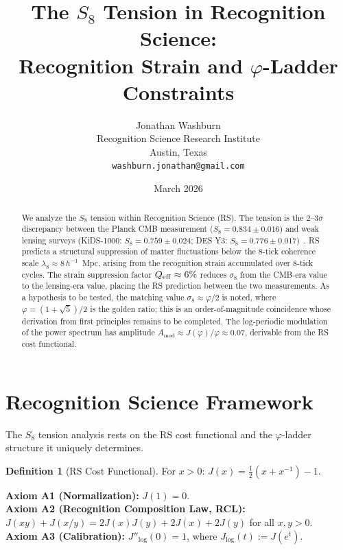 \documentclass[12pt,a4paper]{article}
\title{The $S_8$ Tension in Recognition Science:\\
Recognition Strain and $\varphi$-Ladder Constraints}
\author{Jonathan Washburn\\
Recognition Science Research Institute\\
Austin, Texas\\
\texttt{washburn.jonathan@gmail.com}}
\date{March 2026}
\theoremstyle{definition}
\newtheorem{definition}[theorem]{Definition}
\theoremstyle{remark}
\begin{document}
\maketitle

\begin{abstract}
We analyze the $S_8$ tension within Recognition Science (RS).  The
tension is the $2$--$3\sigma$ discrepancy between the Planck CMB
measurement ($S_8 = 0.834 \pm 0.016$) and weak lensing surveys
(KiDS-1000: $S_8 = 0.759 \pm 0.024$; DES Y3: $S_8 = 0.776 \pm
0.017$)~\cite{Asgari2021,DES2022}.  RS predicts a structural
suppression of matter fluctuations below the 8-tick coherence scale
$\lambda_8 \approx 8\,h^{-1}$~Mpc, arising from the recognition strain
accumulated over 8-tick cycles.  The strain suppression factor
$Q_{\rm eff} \approx 6\%$ reduces $\sigma_8$ from the CMB-era value to
the lensing-era value, placing the RS prediction between the two
measurements.  As a hypothesis to be tested, the matching value
$\sigma_8 \approx \varphi/2$ is noted, where $\varphi = (1+\sqrt{5})/2$
is the golden ratio; this is an order-of-magnitude coincidence whose
derivation from first principles remains to be completed.  The
log-periodic modulation of the power spectrum has amplitude
$A_{\mathrm{mod}} \approx J(\varphi)/\varphi \approx 0.07$, derivable
from the RS cost functional.
\end{abstract}

\section{Recognition Science Framework}
\label{sec:framework}

The $S_8$ tension analysis rests on the RS cost functional and the
$\varphi$-ladder structure it uniquely determines.

\begin{definition}[RS Cost Functional]
For $x > 0$: $J(x) = \tfrac{1}{2}(x + x^{-1}) - 1$.
\end{definition}

\noindent\textbf{Axiom A1 (Normalization):} $J(1) = 0$.\\
\textbf{Axiom A2 (Recognition Composition Law, RCL):}
$J(xy)+J(x/y)=2J(x)J(y)+2J(x)+2J(y)$ for all $x,y>0$.\\
\textbf{Axiom A3 (Calibration):} $J''_{\log}(0) = 1$, where
$J_{\log}(t) := J(e^t)$.
\end{document}
